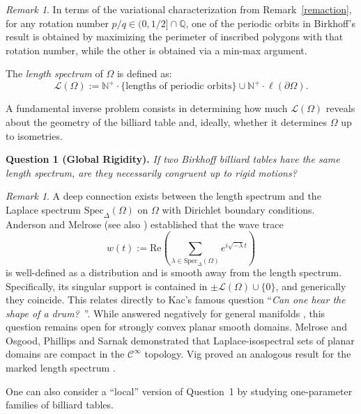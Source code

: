 \documentclass[12pt, openany]{amsart}
\theoremstyle{definition}
\theoremstyle{remark}
\theoremstyle{remark}
\newtheorem{remark}[theorem]{Remark}
\theoremstyle{theorem}
\theoremstyle{theorem}
\theoremstyle{theorem}
\theoremstyle{theorem}
\begin{document}
\begin{remark}
    In terms of the variational characterization from Remark~\ref{remaction}, for any rotation number $p/q \in (0,1/2] \cap \mathbb{Q}$, one of the periodic orbits in Birkhoff's result is obtained by maximizing the perimeter of inscribed polygons with that rotation number, while the other is obtained via a min-max argument.
\end{remark}



The \emph{length spectrum} of $\Omega$ is defined as:
\[
\mathscr{L}(\Omega) := \mathbb{N}^+ \cdot \{\text{lengths of periodic orbits}\} \cup \mathbb{N}^+ \cdot \ell(\partial\Omega).
\]

A fundamental inverse problem consists in determining how much $\mathscr{L}(\Omega)$ reveals about the geometry of the billiard table and, ideally, whether it determines $\Omega$ up to isometries.

\medskip
\textbf{Question 1 (Global Rigidity).} \textit{If two Birkhoff billiard tables have the same length spectrum, are they necessarily congruent up to rigid motions?}



\begin{remark}
    A deep connection exists between the length spectrum and the Laplace spectrum $\mathrm{Spec}_\Delta(\Omega)$ on $\Omega$ with Dirichlet boundary conditions. Anderson and Melrose \cite{AM} (see also \cite{GM, PS, SafVas}) established that the wave trace
    \[
    w(t) := \mathrm{Re}\left( \sum_{\lambda \in \mathrm{Spec}_\Delta(\Omega)} e^{i\sqrt{-\lambda} t} \right)
    \]
    is well-defined as a distribution and is smooth away from the length spectrum. Specifically, its singular support is contained in $\pm \mathscr{L}(\Omega) \cup \{0\}$, and generically they coincide. This relates directly to Kac's famous question \cite{Kac} ``{\it Can one hear the shape of a drum?}~''. While answered negatively for general manifolds \cite{GordonWebbWolpert}, this question remains open for strongly convex planar smooth domains. Melrose \cite{MelroseIsospectral} and Osgood, Phillips and Sarnak \cite{OsgoodPhillipsSarnak1, OsgoodPhillipsSarnak2, OsgoodPhillipsSarnak3} demonstrated that Laplace-isospectral sets of planar domains are compact in the $\mathscr{C}^{\infty}$ topology.  Vig proved an analogous result for the marked length spectrum \cite{Vig}.
\end{remark}

One can also consider a ``local'' version of Question~1 by studying one-parameter families of billiard tables.
\end{document}
